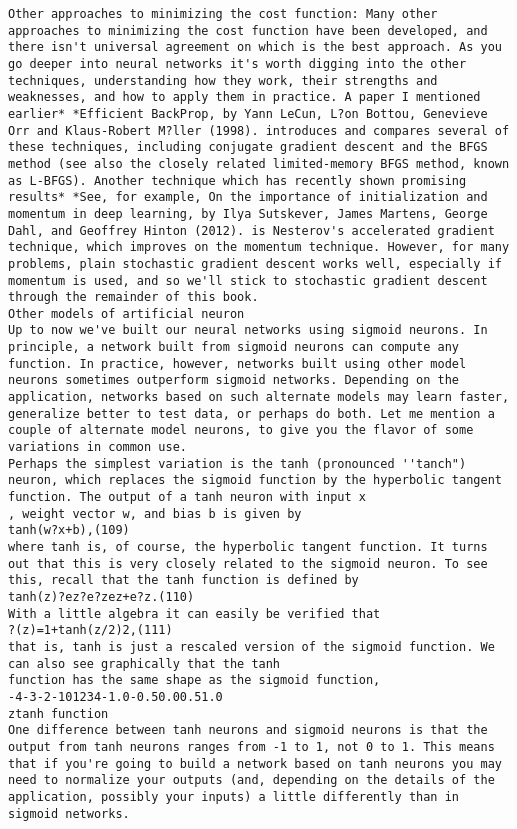 \begin{lstlisting}
Other approaches to minimizing the cost function: Many other approaches to minimizing the cost function have been developed, and there isn't universal agreement on which is the best approach. As you go deeper into neural networks it's worth digging into the other techniques, understanding how they work, their strengths and weaknesses, and how to apply them in practice. A paper I mentioned earlier* *Efficient BackProp, by Yann LeCun, L?on Bottou, Genevieve Orr and Klaus-Robert M?ller (1998). introduces and compares several of these techniques, including conjugate gradient descent and the BFGS method (see also the closely related limited-memory BFGS method, known as L-BFGS). Another technique which has recently shown promising results* *See, for example, On the importance of initialization and momentum in deep learning, by Ilya Sutskever, James Martens, George Dahl, and Geoffrey Hinton (2012). is Nesterov's accelerated gradient technique, which improves on the momentum technique. However, for many problems, plain stochastic gradient descent works well, especially if momentum is used, and so we'll stick to stochastic gradient descent through the remainder of this book.
Other models of artificial neuron
Up to now we've built our neural networks using sigmoid neurons. In principle, a network built from sigmoid neurons can compute any function. In practice, however, networks built using other model neurons sometimes outperform sigmoid networks. Depending on the application, networks based on such alternate models may learn faster, generalize better to test data, or perhaps do both. Let me mention a couple of alternate model neurons, to give you the flavor of some variations in common use.
Perhaps the simplest variation is the tanh (pronounced ''tanch") neuron, which replaces the sigmoid function by the hyperbolic tangent function. The output of a tanh neuron with input x
, weight vector w, and bias b is given by 
tanh(w?x+b),(109)
where tanh is, of course, the hyperbolic tangent function. It turns out that this is very closely related to the sigmoid neuron. To see this, recall that the tanh function is defined by 
tanh(z)?ez?e?zez+e?z.(110)
With a little algebra it can easily be verified that 
?(z)=1+tanh(z/2)2,(111)
that is, tanh is just a rescaled version of the sigmoid function. We can also see graphically that the tanh
function has the same shape as the sigmoid function,
-4-3-2-101234-1.0-0.50.00.51.0
ztanh function
One difference between tanh neurons and sigmoid neurons is that the output from tanh neurons ranges from -1 to 1, not 0 to 1. This means that if you're going to build a network based on tanh neurons you may need to normalize your outputs (and, depending on the details of the application, possibly your inputs) a little differently than in sigmoid networks.

\end{lstlisting}
